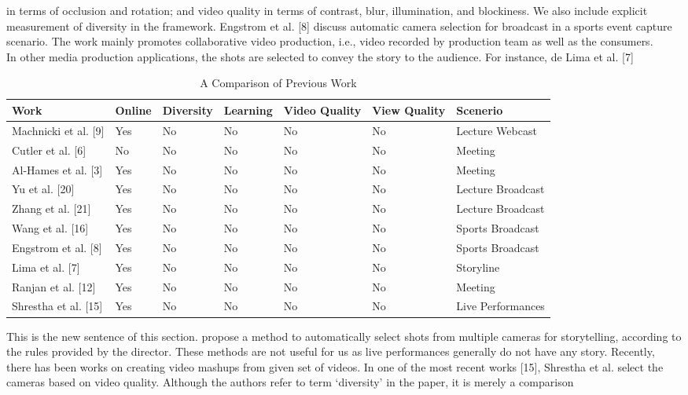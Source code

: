 \documentclass{sig-alternate}
\begin{document}
{{{in terms of occlusion and rotation; and video quality in terms
of contrast, blur, illumination, and blockiness. We also include
explicit measurement of diversity in the framework. Engstrom et
al. [8] discuss automatic camera selection for broadcast in a sports
event capture scenario. The work mainly promotes collaborative
video production, i.e., video recorded by production team as well
as the consumers.\\
In other media production applications, the shots are selected to
convey the story to the audience. For instance, de Lima et al. [7]
\begin{table}
\centering
\caption{A Comparison of Previous Work}
\begin{tabular}{l|l|l|l|l|l|l} \hline
Work&Online&Diversity&Learning&Video Quality&View Quality&Scenerio\\ \hline
Machnicki et al. [9] & Yes& No & No & No & No & Lecture Webcast\\ \hline
Cutler et al. [6] & No& No & No & No & No & Meeting \\ \hline
Al-Hames et al. [3]& Yes& No & No & No & No &Meeting \\ \hline
Yu et al. [20]& Yes& No & No & No & No & Lecture Broadcast\\ \hline
Zhang et al. [21]& Yes& No & No & No & No & Lecture Broadcast\\ \hline
Wang et al. [16]& Yes& No & No & No & No & Sports Broadcast\\ \hline
Engstrom et al. [8]& Yes& No & No & No & No & Sports Broadcast\\ \hline
Lima et al. [7]& Yes& No & No & No & No & Storyline\\ \hline
Ranjan et al. [12]& Yes& No & No & No & No & Meeting \\ \hline
Shrestha et al. [15]& Yes& No & No & No & No & Live Performances\\ \hline
\end{tabular}
\end{table}
This is the new sentence of this section.
propose a method to automatically select shots from multiple cameras
for storytelling, according to the rules provided by the director.
These methods are not useful for us as live performances generally
do not have any story.
Recently, there has been works on creating video mashups from
given set of videos. In one of the most recent works [15], Shrestha
et al. select the cameras based on video quality. Although the authors
refer to term ‘diversity’ in the paper, it is merely a comparison
}}}
\end{document}
